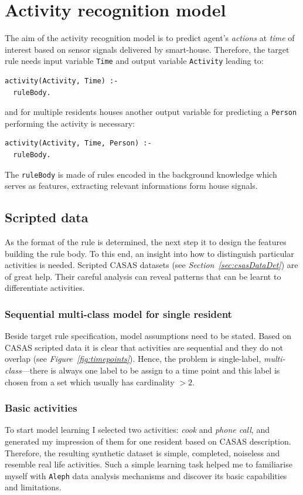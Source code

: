 \documentclass[10pt, a4paper, pdflatex, leqno, twoside, openright]{report}
\begin{document}
\chapter{Activity recognition model}
The aim of the activity recognition model is to predict agent's \emph{actions} at \emph{time} of interest based on sensor signals delivered by smart-house. Therefore, the target rule needs input variable \texttt{Time} and output variable \texttt{Activity} leading to:\\
\begin{verbatim}
activity(Activity, Time) :-
  ruleBody.
\end{verbatim}
and for multiple residents houses another output variable for predicting a \texttt{Person} performing the activity is necessary:\\
\begin{verbatim}
activity(Activity, Time, Person) :-
  ruleBody.
\end{verbatim}
The \texttt{ruleBody} is made of rules encoded in the background knowledge which serves as features, extracting relevant informations form house signals.

  \section{Scripted data} %
As the format of the rule is determined, the next step it to design the features building the rule body. To this end, an insight into how to distinguish particular activities is needed. Scripted CASAS datasets (see \emph{Section~\ref{sec:csasDataDet}}) are of great help. Their careful analysis can reveal patterns that can be learnt to differentiate activities.

    \subsection{Sequential multi-class model for single resident\label{ch:smcm}}
Beside target rule specification, model assumptions need to be stated. Based on CASAS scripted data it is clear that activities are sequential and they do not overlap (see \emph{Figure~\ref{fig:timepoints}}). Hence, the problem is single-label, \emph{multi-class}---there is always one label to be assign to a time point and this label is chosen from a set which usually has cardinality $>2$.

    \subsection{Basic activities\label{sec:basicActibities}}
To start model learning I selected two activities: \emph{cook} and \emph{phone call}, and generated my impression of them for one resident based on CASAS description. Therefore, the resulting synthetic dataset is simple, completed, noiseless and resemble real life activities. Such a simple learning task helped me to familiarise myself with \texttt{Aleph} data analysis mechanisms and discover its basic capabilities and limitations.
\end{document}
